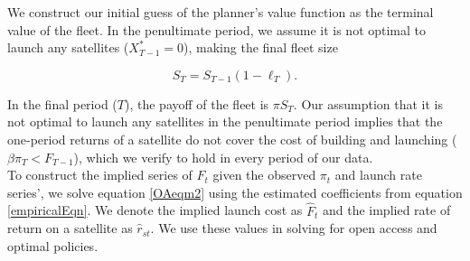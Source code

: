 \documentclass[12pt]{article}
\begin{document}
We construct our initial guess of the planner's value function as the terminal value of the fleet. In the penultimate period, we assume it is not optimal to launch any satellites ($X^*_{T-1} = 0$), making the final fleet size 

\[ S_T = S_{T-1}(1-\ell_T) .\]

In the final period ($T$), the payoff of the fleet is $\pi S_T$. Our assumption that it is not optimal to launch any satellites in the penultimate period implies that the one-period returns of a satellite do not cover the cost of building and launching ($\beta \pi_T < F_{T-1}$), which we verify to hold in every period of our data. \\

To construct the implied series of $F_t$ given the observed $\pi_t$ and launch rate series', we solve equation \ref{OAeqm2} using the estimated coefficients from equation \ref{empiricalEqn}. We denote the implied launch cost as $\hat{F}_t$ and the implied rate of return on a satellite as $\hat{r}_{st}$. We use these values in solving for open access and optimal policies. \\
\end{document}
